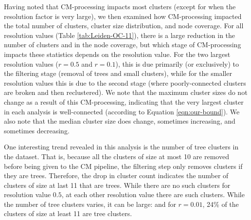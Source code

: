 \documentclass[11pt]{article}   	%
\begin{document}
Having noted that CM-processing impacts most clusters (except for when the resolution factor is very large), we then examined how CM-processing impacted the total number of clusters, cluster size distribution, and node coverage.
For all resolution values (Table \ref{tab:Leiden-OC-11}), there is a large reduction in the number of clusters and in the node coverage, but which stage of CM-processing impacts these statistics depends on the resolution value.
For the  two largest resolution values ($r=0.5$ and $r=0.1$), this is
due primarily (or exclusively) to the filtering stage (removal of trees and small clusters),
while  for the smaller resolution values this is due to the second stage (where poorly-connected clusters are broken and then reclustered).
We note that the maximum cluster sizes do not change as a result of this CM-processing, indicating that the very largest cluster in each analysis is well-connected (according to Equation \ref{eqn:our-bound}).
We also note that the median cluster size does change, sometimes increasing,  and sometimes decreasing.

One interesting trend revealed in this analysis is the number of tree clusters in the dataset.
That is, because all the clusters of size at most 10 are removed before being given to the CM pipeline, the filtering
step only removes clusters if they are trees.
Therefore, the drop in cluster count indicates the number of clusters of size at last 11 that are trees.
While there are no such clusters for resolution value $0.5$, at each other resolution value there are such clusters.
While the number of tree clusters varies, it can be large: and for $r=0.01$, 24\% of the clusters of size at least 11 are tree clusters.
\end{document}
